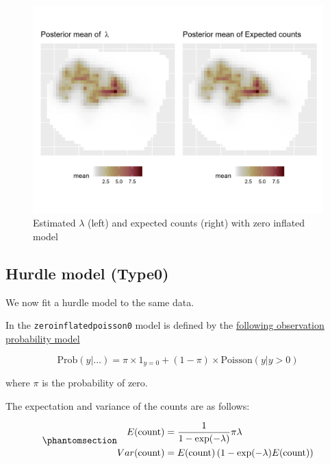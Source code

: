 \documentclass[
  letterpaper,
  DIV=11,
  numbers=noendperiod]{scrartcl}
\begin{document}
\begin{figure}[H]

{\centering \includegraphics[width=0.8\linewidth,height=\textheight,keepaspectratio]{day5_practical_8_files/figure-pdf/unnamed-chunk-73-1.png}

}

\caption{Estimated \(\lambda\) (left) and expected counts (right) with
zero inflated model}

\end{figure}%

\subsection{Hurdle model (Type0)}\label{sec-zap}

We now fit a hurdle model to the same data.

In the \texttt{zeroinflatedpoisson0} model is defined by the
\href{https://inla.r-inla-download.org/r-inla.org/doc/likelihood/zeroinflated.pdf}{following
observation probability model}

\[
\text{Prob}(y\vert\dots)=\pi\times 1_{y=0}+(1-\pi)\times \text{Poisson}(y\vert y>0)
\]

where \(\pi\) is the probability of zero.

The expectation and variance of the counts are as follows:

\begin{equation}\phantomsection\label{eq-mean-zap}{
\begin{aligned}
E(\text{count})&=\frac{1}{1-\exp(-\lambda)}\pi\lambda \\
Var(\text{count})&=  E(\text{count}) \left(1-\exp(-\lambda) E(\text{count})\right)
\end{aligned}
}\end{equation}
\end{document}
